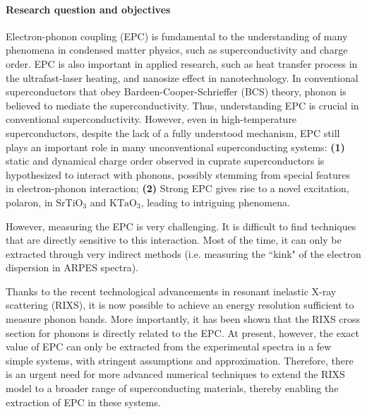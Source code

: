 \documentclass[11pt]{article}
\begin{document}
\paragraph{Research question and objectives}
Electron-phonon coupling (EPC) is fundamental to the understanding of many phenomena in condensed matter physics, such as superconductivity\cite{bardeen_theory_1957,cuk_review_2005} and charge order\cite{arpaia_charge_2021,comin_resonant_2016,tranquada_spins_2013}. EPC is also important in applied research, such as heat transfer process in the ultrafast-laser heating\cite{guo_heat_2012}, and nanosize effect in nanotechnology\cite{zheng_dynamics_2018}.
In conventional superconductors that obey Bardeen-Cooper-Schrieffer (BCS) theory, phonon is believed to mediate the superconductivity\cite{bardeen_theory_1957}. 
Thus, understanding EPC is crucial in conventional superconductivity. 
However, even in high-temperature superconductors, despite the lack of a fully understood mechanism, EPC still plays an important role in many unconventional superconducting systems: \textbf{(1)} static and dynamical charge order observed in cuprate superconductors is hypothesized to interact with phonons, possibly stemming from special features in electron-phonon interaction\cite{lin_strongly_2020,wang_charge_2021,huang_quantum_2021,miao_incommensurate_2018,tacon_inelastic_2014,li_multiorbital_2020,chaix_dispersive_2017,braicovich_determining_2020}; 
\textbf{(2)} Strong EPC gives rise to a novel excitation, polaron, in $\mathrm{SrTiO_3}$ and $\mathrm{KTaO_3}$, leading to intriguing phenomena\cite{swartz_polaronic_2018,chen_orientation-dependent_2023}. 

However, measuring the EPC is very challenging. 
It is difficult to find techniques that are directly sensitive to this interaction. Most of the time, it can only be extracted through very indirect methods (i.e. measuring the ``kink" of the electron dispersion in ARPES spectra).

Thanks to the recent technological advancements in resonant inelastic X-ray scattering (RIXS), it is now possible to achieve an energy resolution sufficient to measure phonon bands. 
More importantly, it has been shown that the RIXS cross section for phonons is directly related to the EPC\cite{ament_determining_2011, devereaux_directly_2016}. 
At present, however, the exact value of EPC can only be extracted from the experimental spectra in a few simple systems, with stringent assumptions and approximation\cite{braicovich_determining_2020,vale_high-resolution_2019}. 
Therefore, there is an urgent need for more advanced numerical techniques to extend the RIXS model to a broader range of superconducting materials, thereby enabling the extraction of EPC in these systems. 
\end{document}
